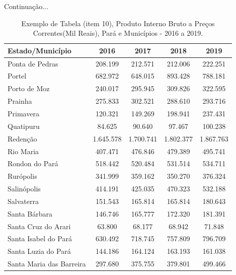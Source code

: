 \newpage
\begin{table}[!htb]
    \centering
    {
    \caption{Exemplo de Tabela (item 10), Produto Interno Bruto a Preços Correntes(Mil Reais), Pará e Municípios - 2016 a 2019.}  Continuação...
    \label{item 10 regras4}
    \vspace{0.1cm}
\begin{tabular}{l|c|c|c|c}
  \hline\hline
  Estado/Município          &    2016     &    2017    &  2018     &  2019         \\
  \hline\hline
   Ponta de Pedras          &  208.199    & 212.571    & 212.006   & 222.251       \\
   Portel                   &  682.972    & 648.015    & 893.428   &  788.181       \\
   Porto de Moz             &  240.017    & 295.945    & 309.826   & 322.595        \\
   Prainha                  &  275.833    & 302.521    & 288.610   & 293.716        \\ 
   Primavera                &  120.321    & 149.269    & 198.941   & 237.431        \\
   Quatipuru                &  84.625     & 90.640     & 97.467    & 100.238        \\
   Redenção                 &  1.645.578  & 1.700.741  & 1.802.377 &  1.867.763     \\
   Rio Maria                &  407.471    & 476.846    & 479.389   &  495.741       \\
   Rondon do Pará           &  518.442    & 520.484    & 531.514   &  534.711       \\
   Rurópolis                &  341.999    & 359.162    & 350.270   &  376.324       \\
   Salinópolis              &  414.191    & 425.035    & 470.323   &  532.188        \\
   Salvaterra               &  151.543    & 165.814    & 165.814   & 180.643         \\
   Santa Bárbara            &  146.746    & 165.777    & 172.320   & 181.391         \\
   Santa Cruz do Arari      &  63.800     & 68.177     & 68.942    & 71.848          \\
   Santa Isabel do Pará     &  630.492    & 718.745    & 757.809   & 796.709         \\
   Santa Luzia do Pará      &  144.186    & 164.124    & 163.193   & 161.038         \\
   Santa Maria das Barreira & 297.680     & 375.755    & 379.801   & 499.466         \\

\end{tabular}}
\end{table}
